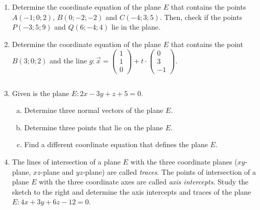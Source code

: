 \documentclass[12pt,eng]{skript_ogg}
\begin{document}
\newpage

\begin{uebung}
\begin{enumerate}[\bfseries 1.]
\setlength{\itemsep}{1ex}
	\item Determine the coordinate equation of the plane $E$ that contains the points $A(-1;0;2)$, $B(0;-2;-2)$ and $C(-4;3;5)$. Then, check if the points $P(-3;5;9)$ and $Q(6;-4;4)$ lie in the plane.
	
	\vspace{8.5cm}
	
	\item Determine the coordinate equation of the plane $E$ that contains the point $B(3;0;2)$ and the line $g:\vec{x}=\begin{pmatrix}1\\1\\0\end{pmatrix}+t\cdot \begin{pmatrix}0\\3\\-1\end{pmatrix}$.
	
	\vspace{8.5cm}
	
	$\text{ }$	
	\newpage
	
	\item Given is the plane $E:2x-3y+z+5=0$.
	\begin{enumerate}[(a)]
	\setlength{\itemsep}{-1ex}
		\item Determine three normal vectors of the plane $E$.
		\item Determine three points that lie on the plane $E$.
		\item Find a different coordinate equation that defines the plane $E$.
	\end{enumerate}
	
	\vspace{6cm}
		
	\item \parbox[t]{8cm}{The lines of intersection of a plane $E$ with the three coordinate planes ($xy$-plane, $xz$-plane and $yz$-plane) are called \emph{traces}. The points of intersection of a plane $E$ with the three coordinate axes are called \emph{axis intercepts}. Study the sketch to the right and determine the axis intercepts and traces of the plane $E:4x+3y+6z-12=0$.}\hfill\parbox[t]{6.5cm}{$\text{ }$\vspace{-3mm}
	
}
\end{enumerate}
\end{uebung}
\end{document}
